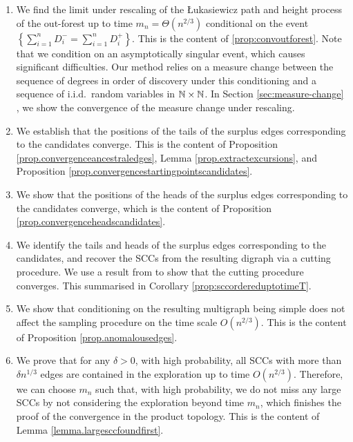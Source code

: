 \begin{enumerate}
    \item We find the limit under rescaling of the \L ukasiewicz path and height process of the out-forest up to time $m_n=\Theta(n^{2/3})$ conditional on the event $\left\{\sum_{i=1}^n D^-_i=\sum_{i=1}^n D^+_i\right\}$. This is the content of  \cref{prop:convoutforest}. Note that we condition on an asymptotically singular event, which causes significant difficulties.   Our method relies on a measure change between the sequence of degrees in order of discovery under this conditioning and a sequence of i.i.d.\ random variables in ${\mathbb N}\times{\mathbb N}$. In Section \ref{sec:measure-change} , we show the convergence of the measure change under rescaling.
    \item We establish that the positions of the tails of the surplus edges corresponding to the candidates converge. This is the content of Proposition \ref{prop.convergenceancestraledges}, Lemma \ref{prop.extractexcursions}, and Proposition \ref{prop.convergencestartingpointscandidates}.
    \item We show that the positions of the heads of the surplus edges corresponding to the candidates converge, which is the content of Proposition \ref{prop.convergenceheadscandidates}. 
    \item We identify the tails and heads of the surplus edges corresponding to the candidates, and recover the SCCs from the resulting digraph via a cutting procedure. We use a result from \cite{goldschmidtScalingLimitCritical2021} to show that the cutting procedure converges. This summarised in Corollary \ref{prop:sccordereduptotimeT}.
    \item We show that conditioning on the resulting multigraph being simple does not affect the sampling procedure on the time scale $O(n^{2/3})$. This is the content of Proposition \ref{prop.anomalousedges}. 
    \item We prove that for any $\delta>0$, with high probability, all SCCs with more than $\delta n^{1/3}$ edges are contained in the exploration up to time $O(n^{2/3})$. Therefore, we can choose $m_n$ such that, with high probability, we do not miss any large SCCs by not considering the exploration beyond time $m_n$, which finishes the proof of the convergence in the product topology. This is the content of Lemma \ref{lemma.largesccfoundfirst}. 
\end{enumerate}



